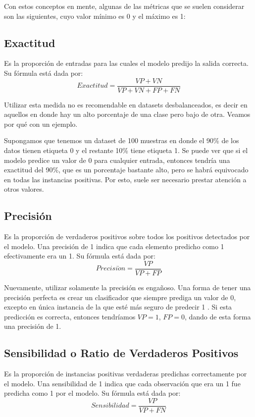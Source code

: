 \documentclass[../../main.tex]{subfiles}
\begin{document}
Con estos conceptos en mente, algunas de las métricas que se suelen considerar son las
siguientes, cuyo valor mínimo es 0 y el máximo es 1:
\subsection{Exactitud}
Es la proporción de entradas para las cuales el modelo predijo la salida correcta.
Su fórmula está dada por:
\[
    Exactitud = \frac{VP + VN}{VP + VN + FP + FN}
\]

Utilizar esta medida no es recomendable en datasets desbalanceados, es decir en aquellos
en donde hay un alto porcentaje de una clase pero bajo de otra. Veamos por qué con un
ejemplo.

Supongamos que tenemos un dataset de 100 muestras en donde el 90\% de los datos tienen
etiqueta 0 y el restante 10\% tiene etiqueta 1. Se puede ver que si el modelo predice un
valor de 0 para cualquier entrada, entonces tendría una exactitud del 90\%, que es un
porcentaje bastante alto, pero se habrá equivocado en todas las instancias positivas.
Por esto, suele ser necesario prestar atención a otros valores.

\subsection{Precisión}
Es la proporción de verdaderos positivos sobre todos los positivos detectados por el
modelo. Una precisión de 1 indica que cada elemento predicho como 1 efectivamente
era un 1. Su fórmula está dada por:
\[
    Precisi\acute{o}n = \frac{VP}{VP + FP}
\]

Nuevamente, utilizar solamente la precisión es engañoso. Una forma de tener una precisión
perfecta es crear un clasificador que siempre prediga un valor de 0, excepto en única
instancia de la que esté más seguro de predecir 1 \cite{hands-on-ML-sklearn-tf}. Si esta
predicción es correcta, entonces tendríamos \(VP=1\), \(FP=0\), dando de esta forma una
precisión de 1.

\subsection{Sensibilidad o Ratio de Verdaderos Positivos}
Es la proporción de instancias positivas verdaderas predichas correctamente por el modelo.
Una sensibilidad de 1 indica que cada observación que era un 1 fue predicha como 1 por el
modelo. Su fórmula está dada por:
\[
    Sensibilidad = \frac{VP}{VP + FN}
\]
\end{document}
